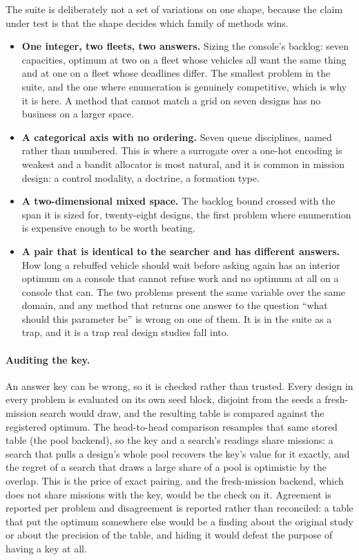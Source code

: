 \documentclass[11pt]{article}
\begin{document}
The suite is deliberately not a set of variations on one shape, because the claim under test is that
the shape decides which family of methods wins.

\begin{itemize}
\item \textbf{One integer, two fleets, two answers.} Sizing the console's backlog: seven capacities,
      optimum at two on a fleet whose vehicles all want the same thing and at one on a fleet whose
      deadlines differ. The smallest problem in the suite, and the one where enumeration is
      genuinely competitive, which is why it is here. A method that cannot match a grid on seven
      designs has no business on a larger space.
\item \textbf{A categorical axis with no ordering.} Seven queue disciplines, named rather than
      numbered. This is where a surrogate over a one-hot encoding is weakest and a bandit allocator
      is most natural, and it is common in mission design: a control modality, a doctrine, a
      formation type.
\item \textbf{A two-dimensional mixed space.} The backlog bound crossed with the span it is sized
      for, twenty-eight designs, the first problem where enumeration is expensive enough to be worth
      beating.
\item \textbf{A pair that is identical to the searcher and has different answers.} How long a
      rebuffed vehicle should wait before asking again has an interior optimum on a console that
      cannot refuse work and no optimum at all on a console that can. The two problems present the
      same variable over the same domain, and any method that returns one answer to the question
      ``what should this parameter be'' is wrong on one of them. It is in the suite as a trap, and
      it is a trap real design studies fall into.
\end{itemize}

\paragraph{Auditing the key.} An answer key can be wrong, so it is checked rather than trusted.
Every design in every problem is evaluated on its own seed block, disjoint from the seeds a fresh-mission search would draw,
and the resulting table is compared against the registered optimum. The head-to-head comparison
resamples that same stored table (the pool backend), so the key and a search's readings share
missions: a search that pulls a design's whole pool recovers the key's value for it exactly, and
the regret of a search that draws a large share of a pool is optimistic by the overlap. This is the
price of exact pairing, and the fresh-mission backend, which does not share missions with the key,
would be the check on it. Agreement is reported per
problem and disagreement is reported rather than reconciled: a table that put the optimum somewhere
else would be a finding about the original study or about the precision of the table, and hiding it
would defeat the purpose of having a key at all.
\end{document}
